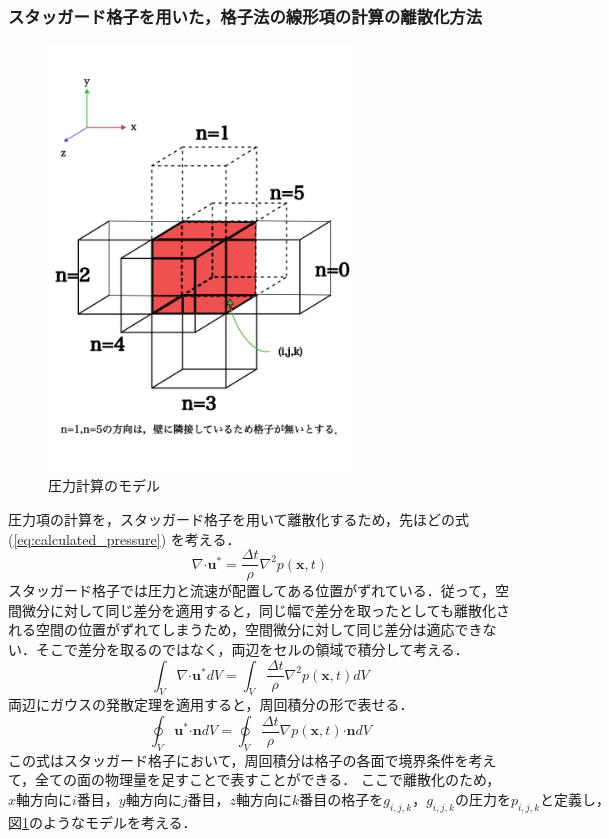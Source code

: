 \documentclass[a4j,12pt]{jreport}
\begin{document}
\subsubsection{スタッガード格子を用いた，格子法の線形項の計算の離散化方法}
\begin{figure}[htbp]
\begin{center}
\includegraphics[width=80mm]{pressure_model.png}
\caption{圧力計算のモデル}
\label{fig:pressure_model}
\end{center}
\end{figure}
圧力項の計算を，スタッガード格子を用いて離散化するため，先ほどの式 (\ref{eq:calculated_pressure}) を考える．
$$\nabla\boldsymbol{\cdot}\bm{u}^* = \frac{\varDelta t}{\rho}\nabla^2 p (\bm{x},t) $$
スタッガード格子では圧力と流速が配置してある位置がずれている．従って，空間微分に対して同じ差分を適用すると，同じ幅で差分を取ったとしても離散化される空間の位置がずれてしまうため，空間微分に対して同じ差分は適応できない．そこで差分を取るのではなく，両辺をセルの領域で積分して考える．
$$\int_V\nabla\boldsymbol{\cdot}\bm{u}^* dV= \int_V\frac{\varDelta t}{\rho}\nabla^2 p (\bm{x},t) dV$$
両辺にガウスの発散定理を適用すると，周回積分の形で表せる．
$$\oint_V\bm{u}^*\boldsymbol{\cdot}\bm{n} dV= \oint_V\frac{\varDelta t}{\rho}\nabla p (\bm{x},t) \boldsymbol{\cdot}\bm{n}dV$$
この式はスタッガード格子において，周回積分は格子の各面で境界条件を考えて，全ての面の物理量を足すことで表すことができる．
ここで離散化のため，$x軸方向にi番目，y軸方向にj番目，z軸方向にk番目の格子をg_{i,j,k}，g_{i,j,k}の圧力をp_{i,j,k}と定義し，$図\ref{fig:pressure_model}のようなモデルを考える．
\end{document}
